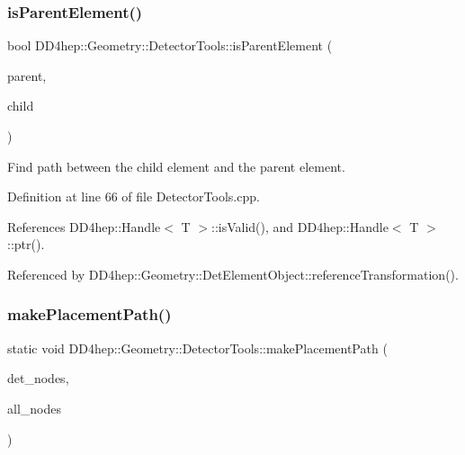 \subsubsection{\texorpdfstring{is\+Parent\+Element()}{isParentElement()}}
{\footnotesize\ttfamily bool D\+D4hep\+::\+Geometry\+::\+Detector\+Tools\+::is\+Parent\+Element (\begin{DoxyParamCaption}\item[{\hyperlink{class_d_d4hep_1_1_geometry_1_1_det_element}{Det\+Element}}]{parent,  }\item[{\hyperlink{class_d_d4hep_1_1_geometry_1_1_det_element}{Det\+Element}}]{child }\end{DoxyParamCaption})}



Find path between the child element and the parent element. 



Definition at line 66 of file Detector\+Tools.\+cpp.



References D\+D4hep\+::\+Handle$<$ T $>$\+::is\+Valid(), and D\+D4hep\+::\+Handle$<$ T $>$\+::ptr().



Referenced by D\+D4hep\+::\+Geometry\+::\+Det\+Element\+Object\+::reference\+Transformation().

\hypertarget{namespace_d_d4hep_1_1_geometry_1_1_detector_tools_adc948b938f4fbbdc46ad6f47f35059a0}{}\label{namespace_d_d4hep_1_1_geometry_1_1_detector_tools_adc948b938f4fbbdc46ad6f47f35059a0} 
\subsubsection{\texorpdfstring{make\+Placement\+Path()}{makePlacementPath()}}
{\footnotesize\ttfamily static void D\+D4hep\+::\+Geometry\+::\+Detector\+Tools\+::make\+Placement\+Path (\begin{DoxyParamCaption}\item[{\hyperlink{namespace_d_d4hep_1_1_geometry_1_1_detector_tools_a6cc33285199e04dd336a33e6e62925e6}{Placement\+Path}}]{det\+\_\+nodes,  }\item[{\hyperlink{namespace_d_d4hep_1_1_geometry_1_1_detector_tools_a6cc33285199e04dd336a33e6e62925e6}{Placement\+Path} \&}]{all\+\_\+nodes }\end{DoxyParamCaption})\hspace{0.3cm}{\ttfamily [static]}}



